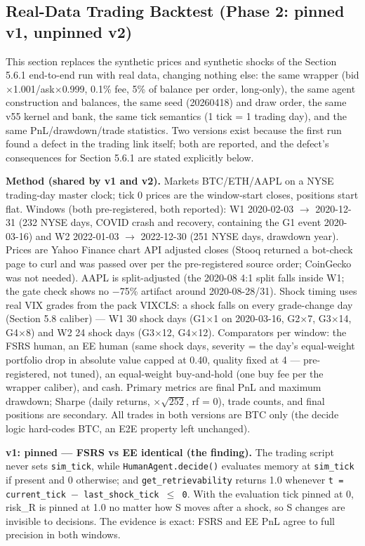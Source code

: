 \documentclass[11pt]{article}
\begin{document}
\subsection{Real-Data Trading Backtest (Phase 2: pinned v1, unpinned v2)}
This section replaces the synthetic prices and synthetic shocks of the Section 5.6.1 end-to-end run with real data, changing nothing else: the same wrapper (bid$\times$1.001/ask$\times$0.999, 0.1\% fee, 5\% of balance per order, long-only), the same agent construction and balances, the same seed (20260418) and draw order, the same v55 kernel and bank, the same tick semantics (1 tick = 1 trading day), and the same PnL/drawdown/trade statistics. Two versions exist because the first run found a defect in the trading link itself; both are reported, and the defect's consequences for Section 5.6.1 are stated explicitly below.

\textbf{Method (shared by v1 and v2).} Markets BTC/ETH/AAPL on a NYSE trading-day master clock; tick 0 prices are the window-start closes, positions start flat. Windows (both pre-registered, both reported): W1 2020-02-03 $\rightarrow$ 2020-12-31 (232 NYSE days, COVID crash and recovery, containing the G1 event 2020-03-16) and W2 2022-01-03 $\rightarrow$ 2022-12-30 (251 NYSE days, drawdown year). Prices are Yahoo Finance chart API adjusted closes (Stooq returned a bot-check page to curl and was passed over per the pre-registered source order; CoinGecko was not needed). AAPL is split-adjusted (the 2020-08 4:1 split falls inside W1; the gate check shows no $-$75\% artifact around 2020-08-28/31). Shock timing uses real VIX grades from the pack VIXCLS: a shock falls on every grade-change day (Section 5.8 caliber) --- W1 30 shock days (G1$\times$1 on 2020-03-16, G2$\times$7, G3$\times$14, G4$\times$8) and W2 24 shock days (G3$\times$12, G4$\times$12). Comparators per window: the FSRS human, an EE human (same shock days, severity = the day's equal-weight portfolio drop in absolute value capped at 0.40, quality fixed at 4 --- pre-registered, not tuned), an equal-weight buy-and-hold (one buy fee per the wrapper caliber), and cash. Primary metrics are final PnL and maximum drawdown; Sharpe (daily returns, $\times$$\sqrt{252}$, rf = 0), trade counts, and final positions are secondary. All trades in both versions are BTC only (the decide logic hard-codes BTC, an E2E property left unchanged).

\textbf{v1: pinned --- FSRS vs EE identical (the finding).} The trading script never sets \texttt{sim\_tick}, while \texttt{HumanAgent.decide()} evaluates memory at \texttt{sim\_tick} if present and 0 otherwise; and \texttt{get\_retrievability} returns 1.0 whenever \texttt{t = current\_tick $-$ last\_shock\_tick $\leq$ 0}. With the evaluation tick pinned at 0, risk\_R is pinned at 1.0 no matter how S moves after a shock, so S changes are invisible to decisions. The evidence is exact: FSRS and EE PnL agree to full precision in both windows.
\end{document}
